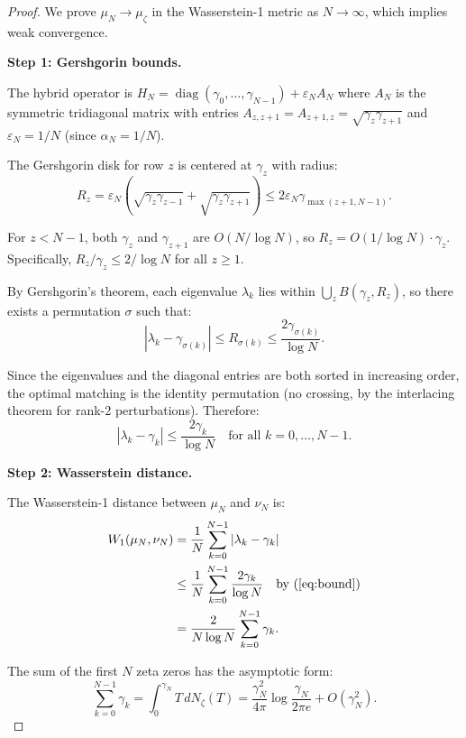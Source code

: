 \documentclass[11pt,a4paper]{article}
\begin{document}
\begin{proof}
We prove $\mu_N \to \mu_\zeta$ in the Wasserstein-1 metric as
$N \to \infty$, which implies weak convergence.

\medskip\noindent
\textbf{Step 1: Gershgorin bounds.}

The hybrid operator is $H_N = \operatorname{diag}(\gamma_0,\ldots,
\gamma_{N-1}) + \varepsilon_N A_N$ where $A_N$ is the symmetric
tridiagonal matrix with entries
$A_{z,z+1} = A_{z+1,z} = \sqrt{\gamma_z\gamma_{z+1}}$ and
$\varepsilon_N = 1/N$ (since $\alpha_N = 1/N$).

The Gershgorin disk for row $z$ is centered at $\gamma_z$ with radius:
\begin{equation}\label{eq:radius}
R_z = \varepsilon_N(\sqrt{\gamma_z\gamma_{z-1}} +
\sqrt{\gamma_z\gamma_{z+1}}) \leq
2\varepsilon_N \gamma_{\max(z+1, N-1)}.
\end{equation}

For $z < N-1$, both $\gamma_z$ and $\gamma_{z+1}$ are $O(N/\log N)$,
so $R_z = O(1/\log N) \cdot \gamma_z$. Specifically,
$R_z / \gamma_z \leq 2/\log N$ for all $z \geq 1$.

By Gershgorin's theorem, each eigenvalue $\lambda_k$ lies within
$\bigcup_z B(\gamma_z, R_z)$, so there exists a permutation $\sigma$
such that:
\[
|\lambda_k - \gamma_{\sigma(k)}| \leq R_{\sigma(k)} \leq
\frac{2\gamma_{\sigma(k)}}{\log N}.
\]

Since the eigenvalues and the diagonal entries are both sorted in
increasing order, the optimal matching is the identity permutation
(no crossing, by the interlacing theorem for rank-2 perturbations).
Therefore:
\begin{equation}\label{eq:bound}
|\lambda_k - \gamma_k| \leq \frac{2\gamma_k}{\log N}
\quad\text{for all }k = 0,\ldots,N-1.
\end{equation}

\medskip\noindent
\textbf{Step 2: Wasserstein distance.}

The Wasserstein-1 distance between $\mu_N$ and $\nu_N$ is:
\begin{align*}
W_1(\mu_N, \nu_N) &= \frac{1}{N}\sum_{k=0}^{N-1}
|\lambda_k - \gamma_k| \\
&\leq \frac{1}{N}\sum_{k=0}^{N-1} \frac{2\gamma_k}{\log N}
\quad\text{by (\ref{eq:bound})}\\
&= \frac{2}{N\log N}\sum_{k=0}^{N-1} \gamma_k.
\end{align*}

The sum of the first $N$ zeta zeros has the asymptotic form:
\[
\sum_{k=0}^{N-1} \gamma_k = \int_0^{\gamma_N} T\,dN_\zeta(T)
= \frac{\gamma_N^2}{4\pi}\log\frac{\gamma_N}{2\pi e} + O(\gamma_N^2).
\]


\end{proof}
\end{document}
